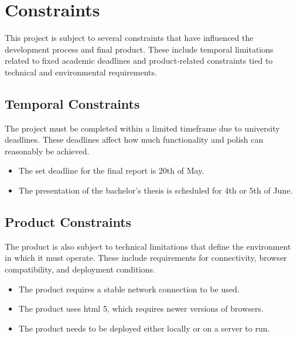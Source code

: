 \begin{itemize}

\end{itemize}

\section{Constraints}

This project is subject to several constraints that have influenced the development process and final product. These include temporal limitations related to fixed academic deadlines and product-related constraints tied to technical and environmental requirements.

\subsection{Temporal Constraints}

The project must be completed within a limited timeframe due to university deadlines. These deadlines affect how much functionality and polish can reasonably be achieved.

\begin{itemize}
    \item The set deadline for the final report is 20th of May.
    \item The presentation of the bachelor's thesis is scheduled for 4th or 5th of June.
\end{itemize}

\subsection{Product Constraints}

The product is also subject to technical limitations that define the environment in which it must operate. These include requirements for connectivity, browser compatibility, and deployment conditions.

\begin{itemize}
    \item The product requires a stable network connection to be used.
    \item The product uses \acrshort{html} 5, which requires newer versions of browsers.
    \item The product needs to be deployed either locally or on a server to run.
\end{itemize}


